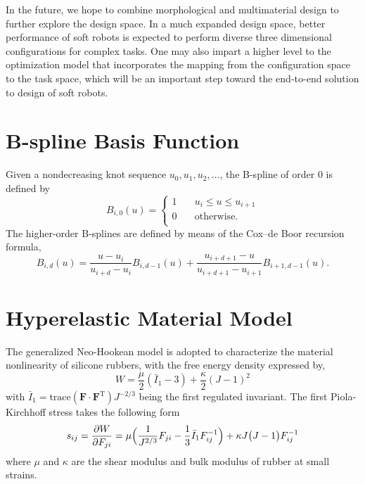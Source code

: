 \documentclass[journal]{IEEEtran}
\renewcommand{\vec}[1]{\mathbf{#1}}
\theoremstyle{definition}
\renewcommand{\vec}[1]{\mathbf{#1}}
\begin{document}
In the future, we hope to combine morphological and multimaterial design to further explore the design space. In a much expanded design space, better performance of soft robots is expected to perform diverse three dimensional configurations for complex tasks. One may also impart a higher level to the optimization model that incorporates the mapping from the configuration space to the task space, which will be an important step toward the end-to-end solution to design of soft robots.

\appendices

\section{B-spline Basis Function}
\label{appendix_basis_function}
Given a nondecreasing knot sequence $u_{0},u_{1},u_{2},\ldots$, the B-spline of order 0 is defined by
\begin{equation}
  B_{i,0}(u)=
  \begin{cases}
    1 & \quad u_{i} \leq u \leq u_{i+1} \\
    0 & \quad \text{otherwise}.         \\
  \end{cases}
\end{equation}
The higher-order B-splines are defined by means of the Cox–de Boor recursion formula,
\begin{equation}
  B_{i,d}(u) = \frac{u-u_i}{u_{i+d}-u_i}B_{i,d-1}(u) + \frac{u_{i+d+1}-u}{u_{i+d+1}-u_{i+1}}B_{i+1,d-1}(u).
\end{equation}

\section{Hyperelastic Material Model}
\label{appendix_hyperelasticModel}
The generalized Neo-Hookean model is adopted to characterize the material nonlinearity of silicone rubbers, with the free energy density expressed by,
\begin{equation}\label{Neo-Hookean}
  W=\frac{\mu}{2} (\bar{I}_1-3)+\frac{\kappa}{2}(J-1)^2
\end{equation}
with $\bar{I}_1=\text{trace} ( \vec{F}\cdot\vec{F}^\mathrm{T}  )J^{-2/3}$ being the first regulated invariant. The first Piola-Kirchhoff stress takes the following form
\begin{equation}
  \begin{split}
    s_{ij}=\frac{\partial W}{\partial F_{ji}}=\mu \Bigl(\frac{1}{J^{2/3}} F_{ji} - \frac{1}{3}\bar{I}_1 F^{-1}_{ij} \Bigr) + \kappa J \bigl(J-1\bigr)F^{-1}_{ij}
  \end{split}
  \label{stress-strain}
\end{equation}
where $\mu$ and $\kappa$ are the shear modulus and bulk modulus of rubber at small strains.
\end{document}
